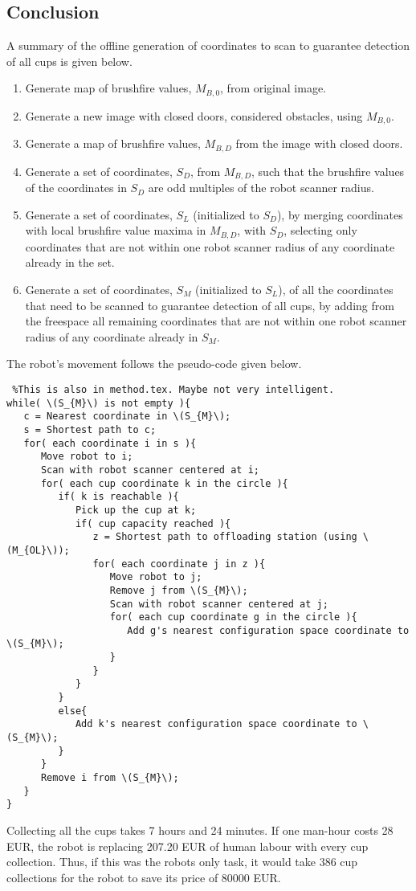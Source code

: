 \subsection{Conclusion}

A summary of the offline generation of coordinates to scan to guarantee detection of all cups is given below.

\begin{enumerate}
\item Generate map of brushfire values, \(M_{B,0}\), from original image.
\item Generate a new image with closed doors, considered obstacles, using \(M_{B,0}\).
\item Generate a map of brushfire values, \(M_{B,D}\) from the image with closed doors.
\item Generate a set of coordinates, \(S_{D}\), from \(M_{B,D}\),
such that the brushfire values of the coordinates in \(S_{D}\) are odd multiples of the robot scanner radius.
\item Generate a set of coordinates, \(S_{L}\) (initialized to \(S_{D}\)), by merging coordinates with local brushfire value maxima
in \(M_{B,D}\), with \(S_{D}\), selecting only coordinates that are not within one robot scanner radius
of any coordinate already in the set.
\item Generate a set of coordinates, \(S_{M}\) (initialized to \(S_{L}\)), of all the coordinates that need to be scanned
to guarantee detection of all cups, by adding from the freespace all remaining coordinates
that are not within one robot scanner radius of any coordinate already in \(S_{M}\).
\end{enumerate}

The robot's movement follows the pseudo-code given below.

\begin{verbatim} %This is also in method.tex. Maybe not very intelligent.
while( \(S_{M}\) is not empty ){
   c = Nearest coordinate in \(S_{M}\);
   s = Shortest path to c;
   for( each coordinate i in s ){
      Move robot to i;
      Scan with robot scanner centered at i;
      for( each cup coordinate k in the circle ){
         if( k is reachable ){
            Pick up the cup at k;
            if( cup capacity reached ){
               z = Shortest path to offloading station (using \(M_{OL}\));
               for( each coordinate j in z ){
                  Move robot to j;
                  Remove j from \(S_{M}\);
                  Scan with robot scanner centered at j;
                  for( each cup coordinate g in the circle ){
                     Add g's nearest configuration space coordinate to \(S_{M}\);
                  }
               }
            }
         }
         else{
            Add k's nearest configuration space coordinate to \(S_{M}\);
         }
      }
      Remove i from \(S_{M}\);
   }
}
\end{verbatim}

Collecting all the cups takes 7 hours and 24 minutes.
If one man-hour costs 28 EUR, the robot is replacing 207.20 EUR of human labour
with every cup collection.
Thus, if this was the robots only task, it would take 386 cup collections for the robot to save its price of 80000 EUR.